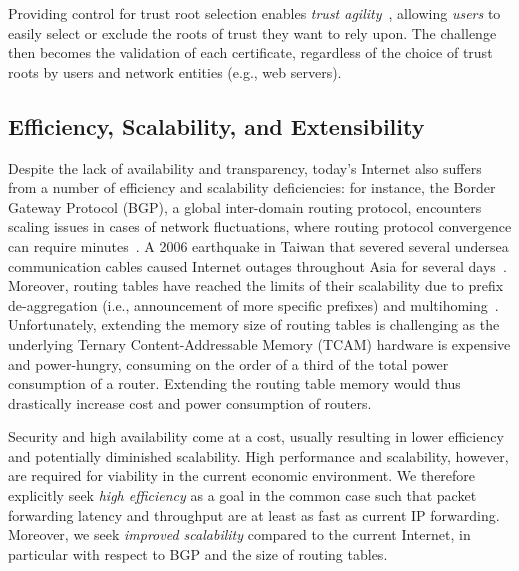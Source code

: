 \documentclass[a4paper]{llncs}
\begin{document}
Providing control for trust root selection enables \emph{trust
agility}~\cite{moxie-trust-agility}, allowing \emph{users} to easily select or
exclude the roots of trust they want to rely upon.
The challenge then becomes the validation of each certificate, regardless of the choice
of trust roots by users and network entities (e.g., web servers).



\subsection{Efficiency, Scalability, and Extensibility}


Despite the lack of availability and transparency, today's Internet
also suffers from a number of efficiency and scalability
deficiencies: for instance, the Border Gateway Protocol (BGP), a global inter-domain routing protocol,
encounters scaling issues in cases of network fluctuations,
where routing protocol convergence can require minutes~\cite{SahKanMoh2009}.
A 2006 earthquake in Taiwan that severed several undersea
communication cables caused Internet outages throughout Asia for several days~\cite{taiwan-earthquake-bbc}.
Moreover, routing tables
have reached the limits of their scalability due to prefix de-aggregation (i.e.,
announcement of more specific prefixes) and multihoming~\cite{Hust2015}.
Unfortunately, extending the memory size of routing tables is
challenging as the underlying Ternary Content-Addressable Memory
(TCAM) hardware is expensive and power-hungry, consuming on the order
of a third of the total power consumption of a router. Extending the
routing table memory would thus drastically increase cost and power
consumption of routers.

Security and high availability come at a cost, usually resulting
in lower efficiency and potentially diminished scalability. High
performance and scalability, however, are required for viability in the current
economic environment. We therefore explicitly seek \emph{high efficiency} as a
goal in the common case such that packet forwarding latency and
throughput are at least as fast as current IP forwarding. Moreover,
we seek \emph{improved scalability} compared to the current Internet,
in particular with respect to BGP and the size of routing
tables.
\end{document}

